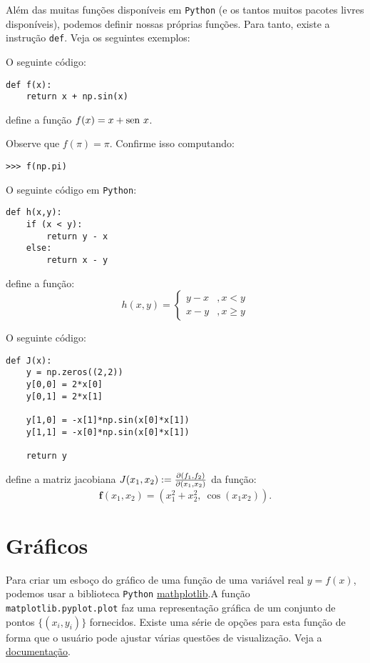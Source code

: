 Além das muitas funções disponíveis em \verb+Python+ (e os tantos muitos pacotes livres disponíveis), podemos definir nossas próprias funções. Para tanto, existe a instrução \verb+def+. Veja os seguintes exemplos:

\begin{ex}
  O seguinte código:
\begin{verbatim}
def f(x): 
    return x + np.sin(x)
\end{verbatim}
define a função $f(x) = x + \operatorname{sen}\, x$.

Observe que $f(\pi) = \pi$. Confirme isso computando:
\begin{verbatim}
>>> f(np.pi)
\end{verbatim}
\end{ex}

\begin{ex}
  O seguinte código em \verb+Python+:
\begin{verbatim}
def h(x,y):
    if (x < y):
        return y - x
    else:
        return x - y
\end{verbatim}
define a função:
\begin{equation}
  h(x,y) = \left\{
    \begin{array}{ll}
      y - x &, x < y\\
      x - y &, x \geq y
    \end{array}
\right.
\end{equation}
\end{ex}

\begin{ex}
  O seguinte código:
\begin{verbatim}
def J(x):
    y = np.zeros((2,2))
    y[0,0] = 2*x[0]
    y[0,1] = 2*x[1]

    y[1,0] = -x[1]*np.sin(x[0]*x[1])
    y[1,1] = -x[0]*np.sin(x[0]*x[1])

    return y
\end{verbatim}
define a matriz jacobiana $J(x_1,x_2) := \frac{\partial(f_1,f_2)}{\partial(x_1,x_2)}$ da função:
\begin{equation}
  \pmb{f}(x_1,x_2) = (x_1^2 + x_2^2,~\cos(x_1x_2)).
\end{equation}
\end{ex}

\section{Gráficos}

Para criar um esboço do gráfico de uma função de uma variável real $y = f(x)$, podemos usar a biblioteca \verb+Python+ \href{http://matplotlib.org/}{mathplotlib}.A função \verb+matplotlib.pyplot.plot+ faz uma representação gráfica de um conjunto de pontos $\{(x_i, y_i)\}$ fornecidos. Existe uma série de opções para esta função de forma que o usuário pode ajustar várias questões de visualização. Veja a \href{http://matplotlib.org/api/pyplot_api.html?highlight=pyplot.plot#matplotlib.pyplot.plot}{documentação}.

